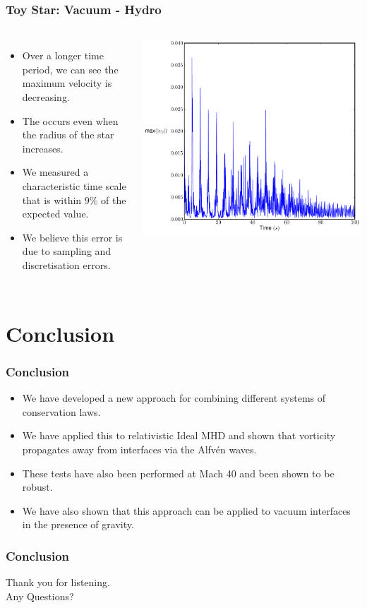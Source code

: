 \documentclass{beamer}
\begin{document}
\begin{frame}
\frametitle{Toy Star: Vacuum - Hydro}
\begin{columns}
\begin{itemize}
\item{Over a longer time period, we can see the maximum velocity is decreasing.}
\item{The occurs even when the radius of the star increases.}
\item{We measured a characteristic time scale that is within $9\%$ of the expected value.}
\item{We believe this error is due to sampling and discretisation errors.}
\end{itemize}
\centering
\includegraphics[width=\textwidth]{../images/toy_max_vx}
\end{columns}
\end{frame}

\section{Conclusion}
\begin{frame}
\frametitle{Conclusion}
\begin{itemize}
\item{We have developed a new approach for combining different systems of conservation laws.}
\item{We have applied this to relativistic Ideal MHD and shown that vorticity propagates away from interfaces via the Alfv\'{e}n waves.}
\item{These tests have also been performed at Mach 40 and been shown to be robust.}
\item{We have also shown that this approach can be applied to vacuum interfaces in the presence of gravity.}
\end{itemize}
\end{frame}
\begin{frame}
\frametitle{Conclusion}
\centering
Thank you for listening.\\
Any Questions?
\end{frame}
\end{document}
